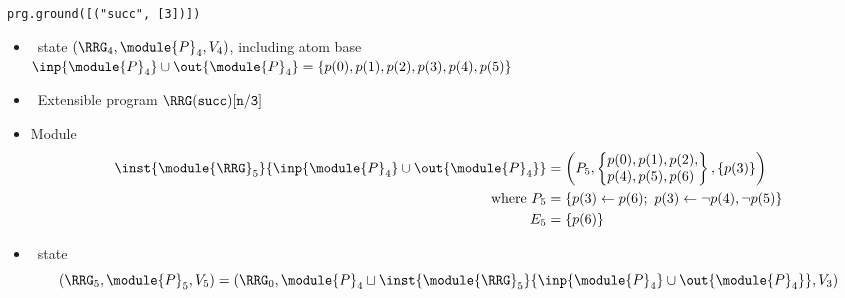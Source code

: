 \begin{frame}{\texttt{prg.ground([("succ", [3])])}}
  \begin{itemize}
  \item {} \clingo\ state $(\boldsymbol{\RRG}_4,\module{P}_4,V_4 )$, including atom base
    \\\qquad\quad
    \(
    {\inp{\module{P}_4}\cup\out{\module{P}_4}}=\{p(0),p(1),p(2),p(3),p(4),p(5)\}
    \)
  \item {} \ Extensible program
    \(
    \RRG(\mathtt{succ})[\mathtt{n}/\mathtt{3}]
    \)
  \item<2->  Module
    \begin{align*}
      \inst{\module{\RRG}_5}{\inp{\module{P}_4}\cup\out{\module{P}_4}}
      &{}=
        \left(
        P_5%
        ,
        \left\{
        \begin{array}{@{}l@{}}
          p(0),p(1),p(2),
          \\
          p(4),p(5),p(6)
        \end{array}
      \right\}
      ,
      \left\{
      p(3)
      \right\}
      \right)
      \\ \text{where }
      P_5 & {} = \{p(3)\leftarrow p(6);\ p(3)\leftarrow \neg p(4),\neg p(5)\}\\
      E_5 & {} = \{p(6)\}
    \end{align*}
  \item<3->  \clingo\ state
    \[
    (\boldsymbol{\RRG}_5,\module{P}_5,V_5 )
    =
    (\boldsymbol{\RRG}_0,\module{P}_4\sqcup\inst{\module{\RRG}_5}{\inp{\module{P}_4}\cup\out{\module{P}_4}},V_3)
    \]
  \end{itemize}
\end{frame}
